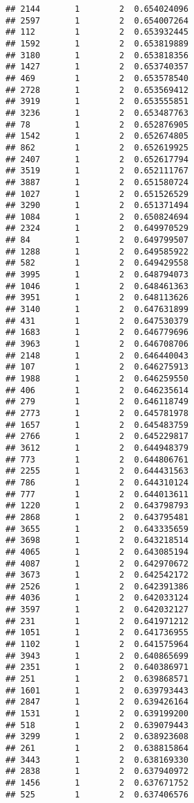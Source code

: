 \documentclass[
]{article}
\begin{document}
\begin{verbatim}
## 2144       1        2  0.654024096
## 2597       1        2  0.654007264
## 112        1        2  0.653932445
## 1592       1        2  0.653819889
## 3180       1        2  0.653818356
## 1427       1        2  0.653740357
## 469        1        2  0.653578540
## 2728       1        2  0.653569412
## 3919       1        2  0.653555851
## 3236       1        2  0.653487763
## 78         1        2  0.652876905
## 1542       1        2  0.652674805
## 862        1        2  0.652619925
## 2407       1        2  0.652617794
## 3519       1        2  0.652111767
## 3887       1        2  0.651580724
## 1027       1        2  0.651526529
## 3290       1        2  0.651371494
## 1084       1        2  0.650824694
## 2324       1        2  0.649970529
## 84         1        2  0.649799507
## 1288       1        2  0.649585922
## 582        1        2  0.649429558
## 3995       1        2  0.648794073
## 1046       1        2  0.648461363
## 3951       1        2  0.648113626
## 3140       1        2  0.647631899
## 431        1        2  0.647530379
## 1683       1        2  0.646779696
## 3963       1        2  0.646708706
## 2148       1        2  0.646440043
## 107        1        2  0.646275913
## 1988       1        2  0.646259550
## 406        1        2  0.646235614
## 279        1        2  0.646118749
## 2773       1        2  0.645781978
## 1657       1        2  0.645483759
## 2766       1        2  0.645229817
## 3612       1        2  0.644948379
## 773        1        2  0.644806761
## 2255       1        2  0.644431563
## 786        1        2  0.644310124
## 777        1        2  0.644013611
## 1220       1        2  0.643798793
## 2868       1        2  0.643795481
## 3655       1        2  0.643335659
## 3698       1        2  0.643218514
## 4065       1        2  0.643085194
## 4087       1        2  0.642970672
## 3673       1        2  0.642542172
## 2526       1        2  0.642391386
## 4036       1        2  0.642033124
## 3597       1        2  0.642032127
## 231        1        2  0.641971212
## 1051       1        2  0.641736955
## 1102       1        2  0.641575964
## 3943       1        2  0.640865699
## 2351       1        2  0.640386971
## 251        1        2  0.639868571
## 1601       1        2  0.639793443
## 2847       1        2  0.639426164
## 1531       1        2  0.639199200
## 518        1        2  0.639079443
## 3299       1        2  0.638923608
## 261        1        2  0.638815864
## 3443       1        2  0.638169330
## 2838       1        2  0.637940972
## 1456       1        2  0.637671752
## 525        1        2  0.637406576

\end{verbatim}
\end{document}
